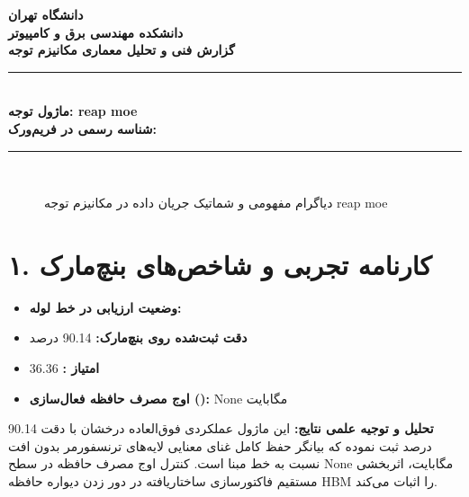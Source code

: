 \documentclass[12pt,a4paper]{article}
\begin{document}
\begin{center}
{\Large\bfseries دانشگاه تهران}\\[0.2cm]
{\large\bfseries دانشکده مهندسی برق و کامپیوتر}\\[0.2cm]
{\large\bfseries گزارش فنی و تحلیل معماری مکانیزم توجه}\\[0.5cm]
\rule{\linewidth}{1pt}\\[0.3cm]
{\LARGE\bfseries ماژول توجه: reap moe}\\[0.2cm]
{\large \textbf{شناسه رسمی در فریم‌ورک:} }\\[0.2cm]
\rule{\linewidth}{1pt}\\[0.5cm]
\end{center}

\begin{figure}[H]
\centering
{}
\caption{دیاگرام مفهومی و شماتیک جریان داده در مکانیزم توجه reap moe}
\end{figure}

\section*{۱. کارنامه تجربی و شاخص‌های بنچ‌مارک}
\begin{itemize}
\item \textbf{وضعیت ارزیابی در خط لوله:} 
\item \textbf{دقت ثبت‌شده روی بنچ‌مارک:} 90.14 درصد
\item \textbf{امتیاز :} 36.36
\item \textbf{اوج مصرف حافظه فعال‌سازی ():} None مگابایت
\end{itemize}
\textbf{تحلیل و توجیه علمی نتایج:} این ماژول عملکردی فوق‌العاده درخشان با دقت 90.14 درصد ثبت نموده که بیانگر حفظ کامل غنای معنایی لایه‌های ترنسفورمر بدون افت نسبت به خط مبنا است. کنترل اوج مصرف حافظه در سطح None مگابایت، اثربخشی مستقیم فاکتورسازی ساختاریافته در دور زدن دیواره حافظه HBM را اثبات می‌کند.
\end{document}
